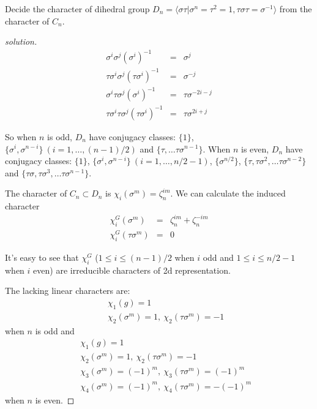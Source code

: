 \documentclass[12pt]{book}
\begin{document}
	\begin{example}
		Decide the character of dihedral group $D_n=\langle\sigma\tau|\sigma^n=\tau^2=1,\tau\sigma\tau=\sigma^{-1}\rangle$ from the character of $C_n$. 
	\end{example}
	\begin{proof}[solution]
		\begin{eqnarray}
			\sigma^i\sigma^j(\sigma^i)^{-1}&=&\sigma^j\\
			\tau\sigma^i\sigma^j(\tau\sigma^i)^{-1}&=&\sigma^{-j}\\
			\sigma^i\tau\sigma^j(\sigma^i)^{-1}&=&\tau\sigma^{-2i-j}\\
			\tau\sigma^i\tau\sigma^j(\tau\sigma^i)^{-1}&=&\tau\sigma^{2i+j}
		\end{eqnarray}
		
		So when $n$ is odd, $D_n$ have conjugacy classes: $\{1\}$, $\{\sigma^i,\sigma^{n-i}\}\ (i=1,\dots,(n-1)/2)$ and $\{\tau,\dots\tau\sigma^{n-1}\}$. When $n$ is even, $D_n$ have conjugacy classes: $\{1\}$, $\{\sigma^i,\sigma^{n-i}\}\ (i=1,\dots,n/2-1)$, $\{\sigma^{n/2}\}$, $\{\tau,\tau\sigma^2,\dots\tau\sigma^{n-2}\}$ and $\{\tau\sigma,\tau\sigma^3,\dots\tau\sigma^{n-1}\}$. 
		
		The character of $C_n\subset D_n$ is $\chi_i(\sigma^m)=\zeta_n^{im}$. We can calculate the induced character
		\begin{eqnarray}
			\chi_i^G(\sigma^m)&=&\zeta_n^{im}+\zeta_n^{-im}\\
			\chi_i^G(\tau\sigma^m)&=&0
		\end{eqnarray}
		
		It's easy to see that $\chi_i^G$ ($1\leq i\leq (n-1)/2$ when $i$ odd and $1\leq i\leq n/2-1$ when $i$ even) are irreducible characters of 2d representation.
		
		The lacking linear characters are:
		\begin{eqnarray}
			&&\chi_1(g)=1\\
			&&\chi_2(\sigma^m)=1,\ \chi_2(\tau\sigma^m)=-1
		\end{eqnarray}
		when $n$ is odd and
		\begin{eqnarray}
			&&\chi_1(g)=1\\
			&&\chi_2(\sigma^m)=1,\ \chi_2(\tau\sigma^m)=-1\\
			&&\chi_3(\sigma^m)=(-1)^m,\ \chi_3(\tau\sigma^m)=(-1)^m\\
			&&\chi_4(\sigma^m)=(-1)^m,\ \chi_4(\tau\sigma^m)=-(-1)^m
		\end{eqnarray}
		when $n$ is even.
	\end{proof}
	
\end{document}

